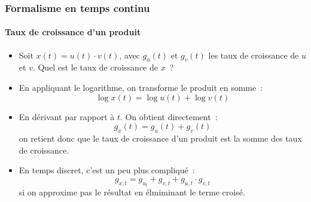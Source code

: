 \documentclass[10pt,notheorems]{beamer}
\theoremstyle{plain}
\theoremstyle{definition} %
\begin{document}
\begin{frame}
  \frametitle{Formalisme en temps continu}
  \framesubtitle{Taux de croissance d'un produit}

  \begin{itemize}

  \item Soit $x(t) = u(t)\cdot v(t)$, avec $g_u(t)$ et $g_v(t)$ les taux de croissance de $u$ et $v$. Quel est le taux de croissance de $x$~?\newline

  \item En appliquant le logarithme, on transforme le produit en somme~:
    \[
      \log x(t) = \log u(t) + \log v(t)
    \]

  \item En dérivant par rapport à $t$. On obtient directement~:
    \[
      g_x(t) = g_u(t) + g_v(t)
    \]
    on retient donc que le taux de croissance d'un produit est la somme des taux de croissance.\newline

  \item[\dbend] En temps discret, c'est un peu plus compliqué~:
    \[
      g_{x,t} = g_{u_t} + g_{v,t} + g_{u,t}\cdot g_{v,t}
    \]
    si on approxime pas le résultat en élmiminant le terme croisé.
  \end{itemize}

\end{frame}
\end{document}
